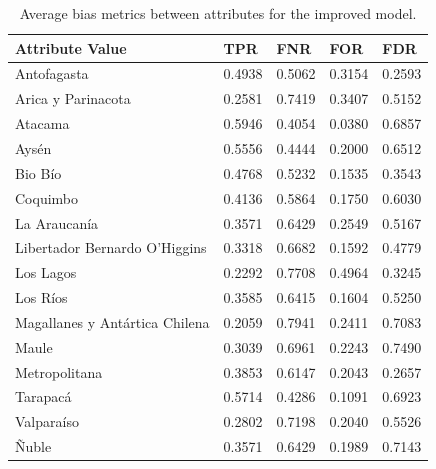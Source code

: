 \documentclass[twoside,11pt]{article}
\begin{document}
\begin{table}[!htb]
\centering
\begin{tabular}{|p{3.5cm}|p{1cm}|p{1cm}|p{1cm}|p{1cm}|}
\hline

        \textbf{Attribute Value} &  \textbf{TPR} &    \textbf{FNR} &      \textbf{FOR} &      \textbf{FDR} \\
\hline
                   Antofagasta & 0.4938 & 0.5062 &   0.3154 &   0.2593 \\
            Arica y Parinacota & 0.2581 & 0.7419 &   0.3407 &   0.5152 \\
                       Atacama & 0.5946 & 0.4054 &   0.0380 &   0.6857 \\
                         Aysén & 0.5556 & 0.4444 &   0.2000 &   0.6512 \\
                       Bio Bío & 0.4768 & 0.5232 &   0.1535 &   0.3543 \\
                      Coquimbo & 0.4136 & 0.5864 & 0.1750 &   0.6030 \\
                  La Araucanía & 0.3571 & 0.6429 &   0.2549 &   0.5167 \\
 Libertador Bernardo O'Higgins & 0.3318 & 0.6682 &   0.1592 &   0.4779 \\
                     Los Lagos & 0.2292 & 0.7708 &   0.4964 &   0.3245 \\
                      Los Ríos & 0.3585 & 0.6415 &   0.1604 & 0.5250 \\
Magallanes y Antártica Chilena & 0.2059 & 0.7941 &   0.2411 &   0.7083 \\
                         Maule & 0.3039 & 0.6961 &   0.2243 &   0.7490 \\
                 Metropolitana & 0.3853 & 0.6147 &   0.2043 &   0.2657 \\
                      Tarapacá & 0.5714 & 0.4286 &   0.1091 &   0.6923 \\
                    Valparaíso & 0.2802 & 0.7198 &   0.2040 &   0.5526 \\
                         Ñuble & 0.3571 & 0.6429 &   0.1989 &   0.7143 \\

\hline
\end{tabular}
\caption{Average bias metrics between attributes for the improved model.}
\label{tab_region_hfalta_opt:}
\end{table}
\end{document}
